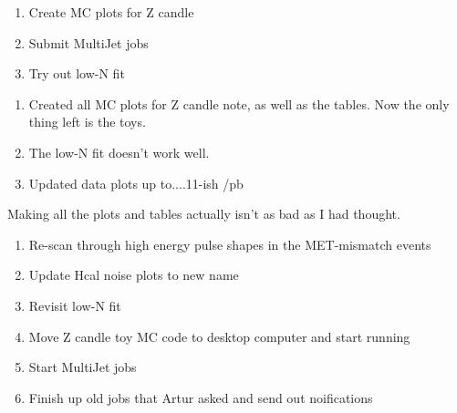 

\begin{enumerate}
\item Create MC plots for Z candle
\item Submit MultiJet jobs
\item Try out low-N fit
\end{enumerate}


\begin{enumerate}
\item Created all MC plots for Z candle note, as well as the tables.  Now the only thing left is the toys.
\item The low-N fit doesn't work well.
\item Updated data plots up to....11-ish /pb
\end{enumerate}


Making all the plots and tables actually isn't as bad as I had thought.


\begin{enumerate}
\item Re-scan through high energy pulse shapes in the MET-mismatch events
\item Update Hcal noise plots to new name
\item Revisit low-N fit
\item Move Z candle toy MC code to desktop computer and start running
\item Start MultiJet jobs
\item Finish up old jobs that Artur asked and send out noifications
\end{enumerate}


